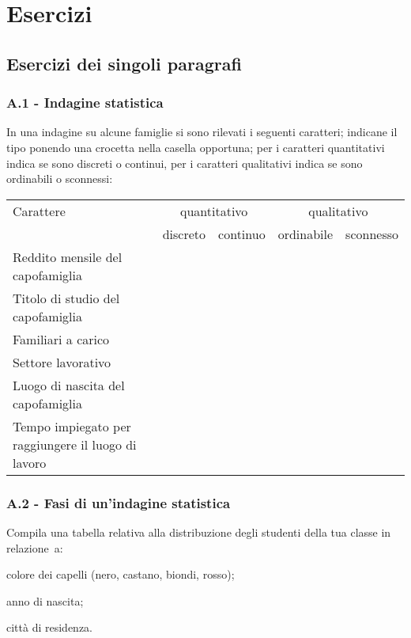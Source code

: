 
\section{Esercizi}
\subsection{Esercizi dei singoli paragrafi}
\subsubsection*{A.1 - Indagine statistica}

\begin{esercizio}
\label{ese:A.1}
In una indagine su alcune famiglie si sono rilevati i seguenti caratteri; indicane il tipo ponendo una crocetta nella casella
opportuna; per i caratteri quantitativi indica se sono discreti o continui, per i caratteri qualitativi indica se sono ordinabili o sconnessi:
\begin{center}
 \begin{tabularx}{.9\textwidth}{Xcccc}
\toprule
Carattere & \multicolumn{2}{c}{quantitativo} & \multicolumn{2}{c}{qualitativo}\\
 & discreto & continuo & ordinabile & sconnesso\\
\midrule
Reddito mensile del capofamiglia & & & & \\
Titolo di studio del capofamiglia & & & & \\
Familiari a carico & & & & \\
Settore lavorativo & & & & \\
Luogo di nascita del capofamiglia & & & & \\
Tempo impiegato per raggiungere il luogo di lavoro & & & & \\
\bottomrule
\end{tabularx}
\end{center}
\end{esercizio}

\subsubsection*{A.2 - Fasi di un'indagine statistica}

\begin{esercizio}
\label{ese:A.2}
Compila una tabella relativa alla distribuzione degli studenti della tua classe in relazione~a:
\begin{itemize*}
\item colore dei capelli (nero, castano, biondi, rosso);
\item anno di nascita;
\item città di residenza.
\end{itemize*}
\end{esercizio}

